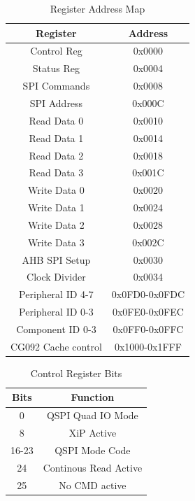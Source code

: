 \documentclass{report}
\begin{document}
\begin{table}[!h]
    \begin{center}
    \caption{Register Address Map}
    \label{address-map}
    \begin{tabular}{||c | c ||}
        \hline
        Register & Address \\ 
        \hline\hline
        Control Reg & 0x0000 \\
        \hline
        Status Reg & 0x0004 \\
        \hline
        SPI Commands & 0x0008 \\
        \hline
        SPI Address & 0x000C \\
        \hline
        Read Data 0 & 0x0010 \\
        \hline
        Read Data 1 & 0x0014 \\
        \hline
        Read Data 2 & 0x0018 \\
        \hline
        Read Data 3 & 0x001C \\
        \hline
        Write Data 0 & 0x0020 \\
        \hline
        Write Data 1 & 0x0024 \\
        \hline
        Write Data 2 & 0x0028 \\
        \hline
        Write Data 3 & 0x002C \\
        \hline
        AHB SPI Setup & 0x0030 \\
        \hline
        Clock Divider & 0x0034 \\
        \hline
        Peripheral ID 4-7 & 0x0FD0-0x0FDC \\
        \hline
        Peripheral ID 0-3 & 0x0FE0-0x0FEC \\
        \hline
        Component ID 0-3 & 0x0FF0-0x0FFC \\
        \hline
        CG092 Cache control & 0x1000-0x1FFF \\
        \hline
    \end{tabular}
\end{center}
\end{table}

\begin{table}[!h]
    \begin{center}
    \caption{Control Register Bits}
    \label{address-map}
    \begin{tabular}{||c | c ||}
        \hline
        Bits & Function \\ 
        \hline\hline
        0 & QSPI Quad IO Mode \\
        \hline 
        8 & XiP Active \\
        \hline
        16-23 & QSPI Mode Code \\
        \hline
        24 & Continous Read Active \\
        \hline 
        25 & No CMD active \\
        \hline
    \end{tabular}
\end{center}
\end{table}
\end{document}
